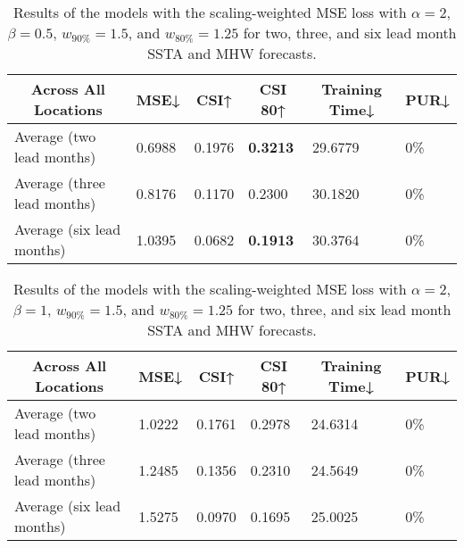 \documentclass[11pt, a4paper]{article}
\begin{document}
\begin{table}[H]
\centering
\scriptsize
\caption{Results of the models with the scaling-weighted MSE loss with $\alpha=2$, $\beta=0.5$, $w_{90\%}=1.5$, and $w_{80\%}=1.25$ for two, three, and six lead month SSTA and MHW forecasts.}\label{tb:swmse2all}
\begin{tabular}{llllll}
\multicolumn{1}{c}{\textbf{Across All Locations}} & \multicolumn{1}{c}{\textbf{MSE↓}} & \multicolumn{1}{c}{\textbf{CSI↑}} & \multicolumn{1}{c}{\textbf{CSI 80↑}} & \multicolumn{1}{c}{\textbf{Training Time↓}} & \multicolumn{1}{c}{\textbf{PUR↓}} \\ \hline
Average (two lead months)             & 0.6988                            & 0.1976                            & \textbf{0.3213}                      & 29.6779                                     & 0\%                               \\
Average (three lead months)           & 0.8176                            & 0.1170                            & 0.2300                               & 30.1820                                     & 0\%                               \\
Average (six lead months)             & 1.0395                            & 0.0682                            & \textbf{0.1913}                      & 30.3764                                     & 0\%
\end{tabular}
\end{table}

\begin{table}[H]
\centering
\scriptsize
\caption{Results of the models with the scaling-weighted MSE loss with $\alpha=2$, $\beta=1$, $w_{90\%}=1.5$, and $w_{80\%}=1.25$ for two, three, and six lead month SSTA and MHW forecasts.}\label{tb:swmse3all}
\begin{tabular}{llllll}
\multicolumn{1}{c}{\textbf{Across All Locations}} & \multicolumn{1}{c}{\textbf{MSE↓}} & \multicolumn{1}{c}{\textbf{CSI↑}} & \multicolumn{1}{c}{\textbf{CSI 80↑}} & \multicolumn{1}{c}{\textbf{Training Time↓}} & \multicolumn{1}{c}{\textbf{PUR↓}} \\ \hline
Average (two lead months)             & 1.0222                            & 0.1761                            & 0.2978                               & 24.6314                                     & 0\%                               \\
Average (three lead months)           & 1.2485                            & 0.1356                            & 0.2310                               & 24.5649                                     & 0\%                               \\
Average (six lead months)             & 1.5275                            & 0.0970                            & 0.1695                               & 25.0025                                     & 0\%
\end{tabular}
\end{table}
\end{document}

